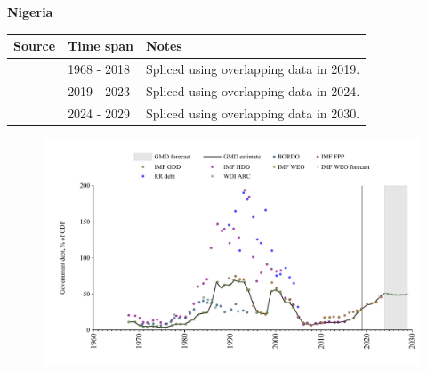 \documentclass[12pt,a4paper,landscape]{article}
\begin{document}
\begin{adjustbox}{max totalsize={\paperwidth}{\paperheight},center}
\begin{minipage}[t][\textheight][t]{\textwidth}
\vspace*{0.5cm}
{}
\begin{center}
{\Large\bfseries Nigeria}
\end{center}
\vspace{0.5cm}
\begin{table}[H]
\centering
\small
\begin{tabular}{|l|l|l|}
\hline
\textbf{Source} & \textbf{Time span} & \textbf{Notes} \\
\hline
\rowcolor{white}\cite{IMF_GDD}& 1968 - 2018 &Spliced using overlapping data in 2019.\\
\rowcolor{lightgray}\cite{IMF_FPP}& 2019 - 2023 &Spliced using overlapping data in 2024.\\
\rowcolor{white}\cite{IMF_WEO_forecast}& 2024 - 2029 &Spliced using overlapping data in 2030.\\
\hline
\end{tabular}
\end{table}
\begin{figure}[H]
\centering
\includegraphics[width=\textwidth,height=0.6\textheight,keepaspectratio]{graphs/NGA_govdebt_GDP.pdf}
\end{figure}
\end{minipage}
\end{adjustbox}
\end{document}
